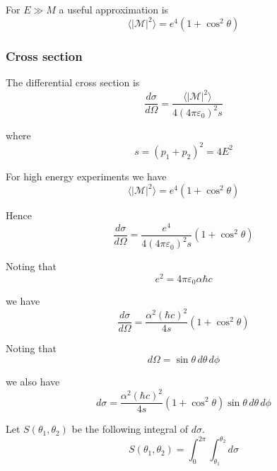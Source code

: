 For $E\gg M$ a useful approximation is
\begin{equation*}
\langle|\mathcal{M}|^2\rangle=e^4\left(1+\cos^2\theta\right)
\end{equation*}

\subsubsection*{Cross section}

The differential cross section is
\begin{equation*}
\frac{d\sigma}{d\Omega}
=\frac{\langle|\mathcal{M}|^2\rangle}{4(4\pi\varepsilon_0)^2s}
\end{equation*}

where
\begin{equation*}
s=(p_1+p_2)^2=4E^2
\end{equation*}

For high energy experiments we have
\begin{equation*}
\langle|\mathcal{M}|^2\rangle=e^4\left(1+\cos^2\theta\right)
\end{equation*}

Hence
\begin{equation*}
\frac{d\sigma}{d\Omega}=\frac{e^4}{4(4\pi\varepsilon_0)^2s}\left(1+\cos^2\theta\right)
\end{equation*}

Noting that
\begin{equation*}
e^2=4\pi\varepsilon_0\alpha\hbar c
\end{equation*}

we have
\begin{equation*}
\frac{d\sigma}{d\Omega}=\frac{\alpha^2(\hbar c)^2}{4s}\left(1+\cos^2\theta\right)
\end{equation*}

Noting that
\begin{equation*}
d\Omega=\sin\theta\,d\theta\,d\phi
\end{equation*}

we also have
\begin{equation*}
d\sigma=\frac{\alpha^2(\hbar c)^2}{4s}\left(1+\cos^2\theta\right)
\sin\theta\,d\theta\,d\phi
\end{equation*}

Let $S(\theta_1,\theta_2)$ be the following integral of $d\sigma$.
\begin{equation*}
S(\theta_1,\theta_2)=\int_0^{2\pi}\int_{\theta_1}^{\theta_2}d\sigma
\end{equation*}

